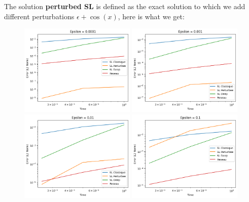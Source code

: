 \documentclass{article}
\begin{document}
\vspace{4cm}

The solution \textbf{perturbed SL} is defined as the exact solution to which we add different perturbations $\epsilon + \cos(x)$, here is what we get:\\

\begin{figure}[!h]
    \centering
    \includegraphics[width=0.49\textwidth]{images/10ep21.png}
    \includegraphics[width=0.49\textwidth]{images/10ep22.png}
    \includegraphics[width=0.49\textwidth]{images/10ep23.png}
    \includegraphics[width=0.49\textwidth]{images/10ep24.png}

\end{figure}
\end{document}
